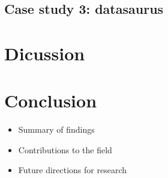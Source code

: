 \documentclass[]{interact}
\theoremstyle{plain}%
\theoremstyle{definition}
\theoremstyle{remark}
\providecommand{\tightlist}{%
  \setlength{\itemsep}{0pt}\setlength{\parskip}{0pt}}
\def\tightlist{}
\begin{document}
\hypertarget{case-study-3-datasaurus}{%
\subsection{Case study 3: datasaurus}\label{case-study-3-datasaurus}}

\hypertarget{dicussion}{%
\section{Dicussion}\label{dicussion}}

\hypertarget{conclusion}{%
\section{Conclusion}\label{conclusion}}

\begin{itemize}
\tightlist
\item
  Summary of findings
\item
  Contributions to the field
\item
  Future directions for research
\end{itemize}



\end{document}
